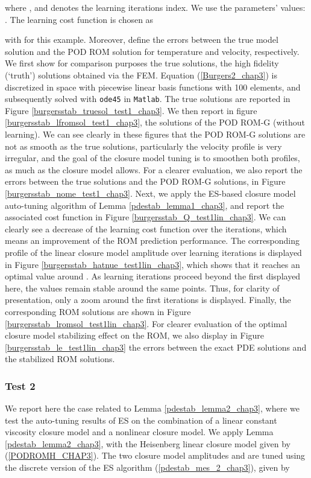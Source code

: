 \documentclass[letterpaper,conference,onecolumn,11pt]{IEEEtran}
\begin{document}
 where , and  denotes the learning iterations index. We use the
 parameters' values: . The learning
cost function is chosen as

with  for this example. Moreover,
 define the
errors between the true model solution and the POD ROM solution
for temperature and velocity, respectively.\\We first show for
comparison purposes the true solutions, the high fidelity
(`truth') solutions obtained via the FEM. Equation
(\ref{Burgers2_chap3}) is discretized in space with piecewise
linear basis functions with 100 elements, and subsequently solved
with \texttt{ode45} in \texttt{Matlab}\textregistered. The true
solutions are reported in Figure
\ref{burgersstab_truesol_test1_chap3}. We then report in figure
\ref{burgersstab_lfromsol_test1_chap3}, the solutions of the POD
ROM-G (without learning). We can see clearly in these figures that
the POD ROM-G solutions are not as smooth as the true solutions,
particularly the velocity profile is very irregular, and the goal
of the closure model tuning is to smoothen both profiles, as much
as the closure model allows. For a clearer evaluation, we also
report the errors between the true solutions and the POD ROM-G
solutions, in Figure \ref{burgersstab_nome_test1_chap3}. Next, we
apply the ES-based closure model auto-tuning algorithm of Lemma
\ref{pdestab_lemma1_chap3}, and report the associated cost
function in Figure \ref{burgersstab_Q_test1lin_chap3}. We can
clearly see a decrease of the learning cost function over the
iterations, which means an improvement of the ROM prediction
performance. The corresponding profile of the linear closure model
amplitude over learning iterations is displayed in Figure
\ref{burgersstab_hatnue_test1lin_chap3}, which shows that it
reaches an optimal value around .  As
learning iterations proceed beyond the first  displayed here,
the values remain stable around the same points. Thus, for clarity
of presentation, only a zoom around the first  iterations is
displayed. Finally, the corresponding ROM solutions are shown in
Figure \ref{burgersstab_lromsol_test1lin_chap3}. For clearer
evaluation of the optimal closure model stabilizing effect on the
ROM, we also display in Figure \ref{burgersstab_le_test1lin_chap3}
the errors between the exact PDE solutions and the stabilized ROM
solutions.
\subsubsection{Test 2} We report here the case related to Lemma
\ref{pdestab_lemma2_chap3}, where we test the auto-tuning results
of ES on the combination of a linear constant viscosity closure
model and a nonlinear closure model. We apply Lemma
\ref{pdestab_lemma2_chap3}, with the Heisenberg linear closure
model given by (\ref{PODROMH_CHAP3}). The two closure model
amplitudes  and  are tuned using the discrete
version of the ES algorithm (\ref{pdestab_mes_2_chap3}), given by
\end{document}
